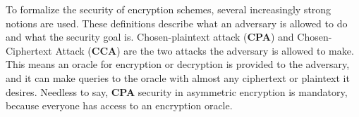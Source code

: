 \begin{itemize}
To formalize the security of encryption schemes, several increasingly strong notions are used. These definitions describe what an adversary is allowed to do and what the security goal is. Chosen-plaintext attack (\textbf{CPA}) and Chosen-Ciphertext Attack (\textbf{CCA}) are the two attacks the adversary is allowed to make. This means an oracle for encryption or decryption is provided to the adversary, and it can make queries to the oracle with almost any ciphertext or plaintext it desires. Needless to say, \textbf{CPA} security in asymmetric encryption is mandatory, because everyone has access to an encryption oracle.








\end{itemize}

